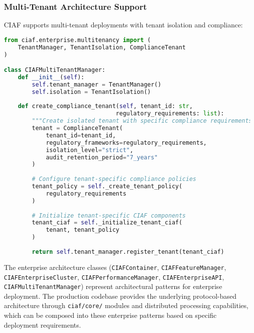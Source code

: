 \documentclass[12pt,a4paper]{article}
\begin{document}
\subsubsection{Multi-Tenant Architecture Support}

CIAF supports multi-tenant deployments with tenant isolation and compliance:

\begin{lstlisting}[language=Python, caption=Multi-Tenant Architecture]
from ciaf.enterprise.multitenancy import (
    TenantManager, TenantIsolation, ComplianceTenant
)

class CIAFMultiTenantManager:
    def __init__(self):
        self.tenant_manager = TenantManager()
        self.isolation = TenantIsolation()
    
    def create_compliance_tenant(self, tenant_id: str, 
                                regulatory_requirements: list):
        """Create isolated tenant with specific compliance requirements."""
        tenant = ComplianceTenant(
            tenant_id=tenant_id,
            regulatory_frameworks=regulatory_requirements,
            isolation_level="strict",
            audit_retention_period="7_years"
        )
        
        # Configure tenant-specific compliance policies
        tenant_policy = self._create_tenant_policy(
            regulatory_requirements
        )
        
        # Initialize tenant-specific CIAF components
        tenant_ciaf = self._initialize_tenant_ciaf(
            tenant, tenant_policy
        )
        
        return self.tenant_manager.register_tenant(tenant_ciaf)
\end{lstlisting}

\begin{tcolorbox}[colframe=blue!70, colback=green!8, title={\textbf{Implementation Note}}]
The enterprise architecture classes (\texttt{CIAFContainer}, \texttt{CIAFFeatureManager}, \texttt{CIAFEnterpriseCluster}, \texttt{CIAFPerformanceManager}, \texttt{CIAFEnterpriseAPI}, \texttt{CIAFMultiTenantManager}) represent architectural patterns for enterprise deployment. The production codebase provides the underlying protocol-based architecture through \texttt{ciaf/core/} modules and distributed processing capabilities, which can be composed into these enterprise patterns based on specific deployment requirements.
\end{tcolorbox}

\end{document}

